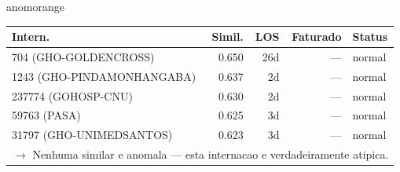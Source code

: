 \documentclass[a4paper,10pt]{article}
\begin{document}
\begin{anomalycard}[Internacao 166442 | GHO-PETROBRAS | ALTO (z=3.71)]{anomorange}
\begin{tabular}{l r r r l}\toprule\textbf{Intern.} & \textbf{Simil.} & \textbf{LOS} & \textbf{Faturado} & \textbf{Status} \\\midrule
704 (GHO-GOLDENCROSS) & 0.650 & 26d & --- & \textcolor{jcubeblue}{normal} \\
1243 (GHO-PINDAMONHANGABA) & 0.637 & 2d & --- & \textcolor{jcubeblue}{normal} \\
237774 (GOHOSP-CNU) & 0.630 & 2d & --- & \textcolor{jcubeblue}{normal} \\
59763 (PASA) & 0.625 & 3d & --- & \textcolor{jcubeblue}{normal} \\
31797 (GHO-UNIMEDSANTOS) & 0.623 & 3d & --- & \textcolor{jcubeblue}{normal} \\
\multicolumn{5}{l}{\textcolor{jcubeblue}{\small $\rightarrow$ Nenhuma similar e anomala --- esta internacao e verdadeiramente atipica.}} \\
\bottomrule\end{tabular}


\end{anomalycard}

\newpage
\end{document}
